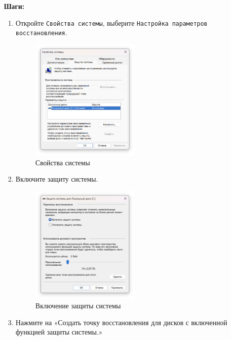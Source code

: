 \documentclass[a4paper, 14pt]{report}
\begin{document}
\begin{enumerate}
{          \textbf{Шаги:}
          \begin{enumerate}
              \item {Откройте \verb|Свойства системы|, выберите \verb|Настройка параметров восстановления|.
                    \begin{figure}[H]
                        \centering
                        \includegraphics[width=0.5\textwidth]{../images/properties-of-system.png}
                        \caption{Свойства системы}
                    \end{figure}
                    }
              \item {Включите защиту системы.
                    \begin{figure}[H]
                        \centering
                        \includegraphics[width=0.5\textwidth]{../images/enable-system-restore.png}
                        \caption{Включение защиты системы}
                    \end{figure}
                    }
              \item {Нажмите на «Создать точку восстановления для дисков с включенной функцией защиты системы.»}

\end{enumerate}}
\end{enumerate}
\end{document}
